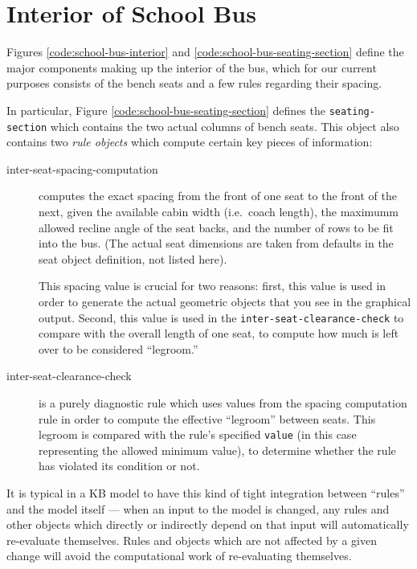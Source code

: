 \documentclass [11pt]{book}
\begin{document}
\section{Interior of School Bus}

\label{sec:interiorofschoolbus}

Figures 
\ref{code:school-bus-interior} and 
\ref{code:school-bus-seating-section} define the major components making up the interior of the bus, which for our
current purposes consists of the bench seats and a few rules regarding their 
spacing.

In particular, Figure 
\ref{code:school-bus-seating-section} defines the \texttt{seating-section} which contains the two actual columns of bench seats. This object also contains
two \emph{rule objects} which compute certain key pieces of information:

\begin{description}

\item [inter-seat-spacing-computation]
computes the exact spacing from the front of one seat to the front of the next,
given the available cabin width (i.e.\ coach length), the maximumm allowed recline angle
of the seat backs, and the number of rows to be fit into the bus. (The actual seat 
dimensions are taken from defaults in the seat object definition, not listed here).

This spacing value is crucial for two reasons: first, this value is used in order to 
generate the actual geometric objects that you see in the graphical output. Second,
this value is used in the \texttt{inter-seat-clearance-check} to compare with the overall length of one seat, to compute how much is 
left over to be considered ``legroom.''
\item [inter-seat-clearance-check]
is a purely diagnostic rule which uses values from the spacing computation
rule in order to compute the effective ``legroom'' between seats. This legroom
is compared with the rule's specified \texttt{value} (in this case representing the allowed minimum value), to determine whether the rule
has violated its condition or not.

\end{description}

It is typical in a KB model to have this kind of tight integration between
``rules'' and the model itself --- when an input to the model is changed, any
rules and other objects which directly or indirectly depend on that input will 
automatically re-evaluate themselves. Rules and objects which are not affected 
by a given change will avoid the computational work of re-evaluating themselves. 
\end{document}
